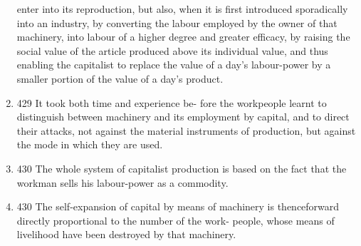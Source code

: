 \documentclass[12pt]{article}
\begin{document}
\begin{enumerate}
enter into its reproduction, but also, when it is first introduced
sporadically into an industry, by converting the labour employed
by the owner of that machinery, into labour of a higher degree and
greater efficacy, by raising the social value of the article produced
above its individual value, and thus enabling the capitalist to
replace the value of a day's labour-power by a smaller portion of
the value of a day's product.
	\item 429 It took both time and experience be-
fore the workpeople learnt to distinguish between machinery and
its employment by capital, and to direct their attacks, not against
the material instruments of production, but against the mode
in which they are used.
	\item 430 The whole system of capitalist production is based
on the fact that the workman sells his labour-power as a commodity.
	\item 430 The self-expansion of capital by means of machinery is
thenceforward directly proportional to the number of the work-
people, whose means of livelihood have been destroyed by that
machinery. 
	

\end{enumerate}
\end{document}
